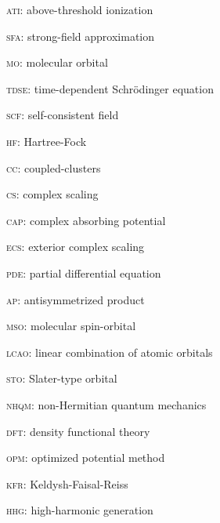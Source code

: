 
\textsc{ati}: above-threshold ionization

\textsc{sfa}: strong-field approximation

\textsc{mo}: molecular orbital

\textsc{tdse}: time-dependent Schr\"{o}dinger equation

\textsc{scf}: self-consistent field

\textsc{hf}: Hartree-Fock

\textsc{cc}: coupled-clusters

\textsc{cs}: complex scaling

\textsc{cap}: complex absorbing potential

\textsc{ecs}: exterior complex scaling

\textsc{pde}: partial differential equation

\textsc{ap}: antisymmetrized product

\textsc{mso}: molecular spin-orbital

\textsc{lcao}: linear combination of atomic orbitals

\textsc{sto}: Slater-type orbital

\textsc{nhqm}: non-Hermitian quantum mechanics

\textsc{dft}: density functional theory

\textsc{opm}: optimized potential method

\textsc{kfr}: Keldysh-Faisal-Reiss

\textsc{hhg}: high-harmonic generation









